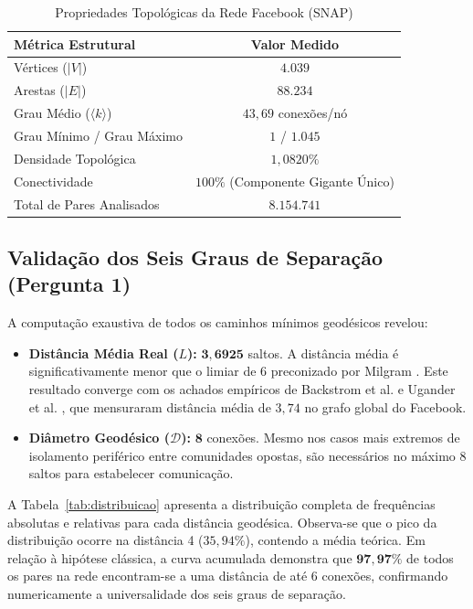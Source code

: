 \documentclass[conference]{IEEEtran}
\begin{document}
\begin{table}[htbp]
\caption{Propriedades Topológicas da Rede Facebook (SNAP)}
\label{tab:topologia}
\centering
\begin{tabular}{lc}
\toprule
\textbf{Métrica Estrutural} & \textbf{Valor Medido} \\
\midrule
Vértices ($|V|$) & $4.039$ \\
Arestas ($|E|$) & $88.234$ \\
Grau Médio ($\langle k \rangle$) & $43,69$ conexões/nó \\
Grau Mínimo / Grau Máximo & $1$ / $1.045$ \\
Densidade Topológica & $1,0820\%$ \\
Conectividade & $100\%$ (Componente Gigante Único) \\
Total de Pares Analisados & $8.154.741$ \\
\bottomrule
\end{tabular}
\end{table}

\subsection{Validação dos Seis Graus de Separação (Pergunta 1)}
A computação exaustiva de todos os caminhos mínimos geodésicos revelou:
\begin{itemize}
    \item \textbf{Distância Média Real ($L$):} $\mathbf{3,6925}$ saltos. A distância média é significativamente menor que o limiar de 6 preconizado por Milgram \cite{milgram1967small,travers1969experimental}. Este resultado converge com os achados empíricos de Backstrom et al. \cite{backstrom2012four} e Ugander et al. \cite{ugander2011anatomy}, que mensuraram distância média de $3,74$ no grafo global do Facebook.
    \item \textbf{Diâmetro Geodésico ($\mathcal{D}$):} $\mathbf{8}$ conexões. Mesmo nos casos mais extremos de isolamento periférico entre comunidades opostas, são necessários no máximo 8 saltos para estabelecer comunicação.
\end{itemize}

A Tabela~\ref{tab:distribuicao} apresenta a distribuição completa de frequências absolutas e relativas para cada distância geodésica. Observa-se que o pico da distribuição ocorre na distância 4 ($35,94\%$), contendo a média teórica. Em relação à hipótese clássica, a curva acumulada demonstra que $\mathbf{97,97\%}$ de todos os pares na rede encontram-se a uma distância de até 6 conexões, confirmando numericamente a universalidade dos seis graus de separação.
\end{document}
